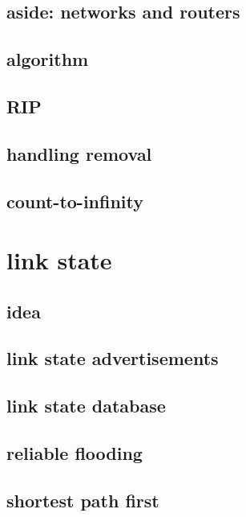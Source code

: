 \subsection{aside: networks and routers}
 

\subsection{algorithm}


\subsection{RIP}



\subsection{handling removal}

\subsection{count-to-infinity}

\section{link state}
\subsection{idea}

\subsection{link state advertisements}

\subsection{link state database}

\subsection{reliable flooding}


\subsection{shortest path first}


